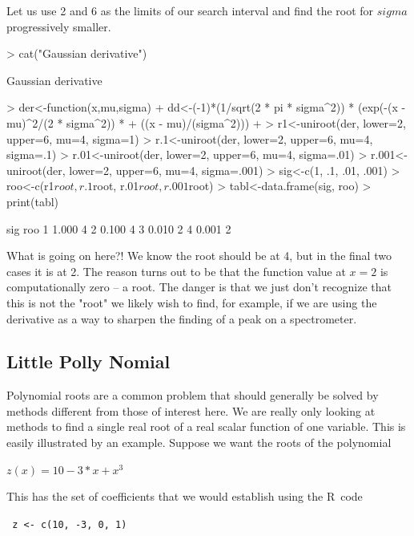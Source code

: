 \documentclass[11pt,letterpaper]{article}
\newcommand{\R}{{\sf R\ }}
\begin{document}
Let us use 2 and 6 as the limits of our search interval and find the root for $sigma$ progressively smaller. 

\begin{Schunk}
\begin{Sinput}
> cat("Gaussian derivative\n")
\end{Sinput}
\begin{Soutput}
Gaussian derivative
\end{Soutput}
\begin{Sinput}
> der<-function(x,mu,sigma){
+     dd<-(-1)*(1/sqrt(2 * pi * sigma^2)) * (exp(-(x - mu)^2/(2 * sigma^2)) * 
+     ((x - mu)/(sigma^2)))
+ }
> r1<-uniroot(der, lower=2, upper=6, mu=4, sigma=1)
> r.1<-uniroot(der, lower=2, upper=6, mu=4, sigma=.1)
> r.01<-uniroot(der, lower=2, upper=6, mu=4, sigma=.01)
> r.001<-uniroot(der, lower=2, upper=6, mu=4, sigma=.001)
> sig<-c(1, .1, .01, .001)
> roo<-c(r1$root, r.1$root, r.01$root, r.001$root)
> tabl<-data.frame(sig, roo)
> print(tabl)
\end{Sinput}
\begin{Soutput}
    sig roo
1 1.000   4
2 0.100   4
3 0.010   2
4 0.001   2
\end{Soutput}
\end{Schunk}

What is going on here?! We know the root should be at 4, but in the final two 
cases it is at 2. The reason turns out to be that the function value at $x=2$ is
computationally zero -- a root. The danger is that we just don't recognize that 
this is not the "root" we likely wish to find, for example, if we are using the
derivative as a way to sharpen the finding of a peak on a spectrometer. 

\subsection{Little Polly Nomial}

Polynomial roots are a common problem that should generally be solved by methods
different from those of interest here. We are really only looking at methods to find
a single real root of a real scalar function of one variable. This is easily illustrated
by an example. Suppose we want the roots of the polynomial

$  z(x) = 10 - 3 * x + x^3 $

This has the set of coefficients that we would establish using the \R  code

\texttt{ z <- c(10, -3, 0, 1) }
\end{document}
